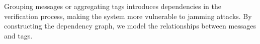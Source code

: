 
Grouping messages or aggregating tags introduces dependencies in the verification process, making the system more vulnerable to jamming attacks. By constructing the dependency graph, we model the relationships between messages and tags.













